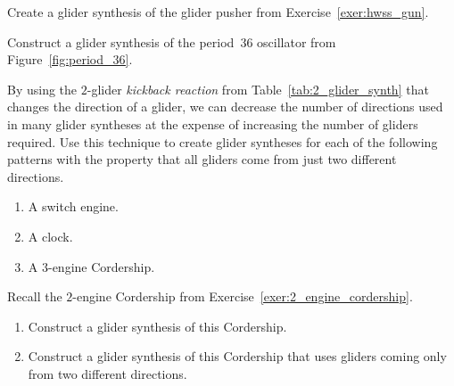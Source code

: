\begin{multicols}{2}
	
	\mfilbreak
	
	
	\begin{problem}\label{exer:synthesize_glider_pusher}
		Create a glider synthesis of the glider pusher from Exercise~\ref{exer:hwss_gun}.
	\end{problem}
	
	
	\mfilbreak
	
	
	\begin{problem}\label{exer:oscillator_syntheses}
		Construct a glider synthesis of the period~36 oscillator from Figure~\ref{fig:period_36}.
	\end{problem}
	
	
	\mfilbreak
	
	
	\begin{problemstar}\label{exer:glider_synth_two_directions}
		By using the $2$-glider \emph{kickback reaction} from Table~\ref{tab:2_glider_synth} that changes the direction of a glider, we can decrease the number of directions used in many glider syntheses at the expense of increasing the number of gliders required. Use this technique to create glider syntheses for each of the following patterns with the property that all gliders come from just two different directions.
		\begin{enumerate}[label=\bf\color{ocre}(\alph*)]
			\item A switch engine.
			
			\item A clock.
			
			\item A $3$-engine Cordership.
		\end{enumerate}
	\end{problemstar}
	
	
	\mfilbreak
	
	
	\begin{problemstar}\label{exer:2_engine_cordership_synthesis}
		Recall the $2$-engine Cordership from Exercise~\ref{exer:2_engine_cordership}.\smallskip
		
		\begin{enumerate}[label=\bf\color{ocre}(\alph*)]
			\item Construct a glider synthesis of this Cordership.
			
			\item Construct a glider synthesis of this Cordership that uses gliders coming only from two different directions.
			

\end{enumerate}
\end{problemstar}
\end{multicols}
